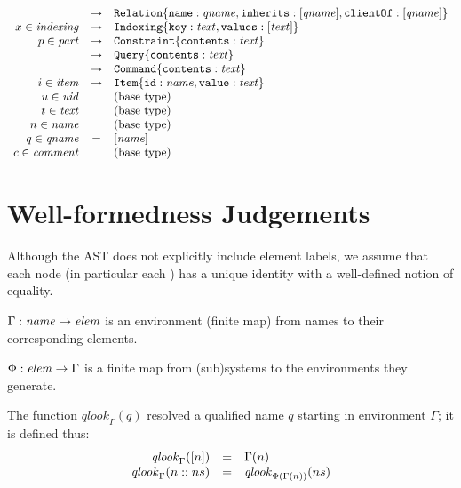 \documentclass{article}
\begin{document}
\[\begin{array}{rcll}
                  & \rightarrow & \texttt{Relation}\{\texttt{name}:\mathit{qname},\texttt{inherits}:[{\mathit{qname}}],
                                                  \texttt{clientOf}:[{\mathit{qname}}]\} \\
  x \in \mathit{indexing} & \rightarrow & \texttt{Indexing}\{\texttt{key}:\mathit{text},\texttt{values}:[{\mathit{text}}]\} \\
  p \in \mathit{part} & \rightarrow & \texttt{Constraint}\{\texttt{contents}:\mathit{text} \} \\
  & \rightarrow & \texttt{Query}\{\texttt{contents}:\mathit{text}\} \\
                  & \rightarrow & \texttt{Command}\{\texttt{contents}:\mathit{text}\} \\
  i \in \mathit{item} & \rightarrow & \texttt{Item}\{\texttt{id}:\mathit{name},\texttt{value}:\mathit{text} \} \\
  u \in \mathit{uid} & & \text{(base type)} \\
  t \in \mathit{text}& & \text{(base type)} \\
  n \in \mathit{name}& & \text{(base type)} \\
  q \in \mathit{qname}& = & [{\mathit{name}}] \\
  c \in \mathit{comment}&  & \text{(base type)} \\
\end{array}
\]
  
\vfill\eject

\section{Well-formedness Judgements}

\newcommand{\senv}{\Phi}
\newcommand{\env}{\Gamma}
\newcommand{\qlookup}[2]{\mathit{qlook}_{#1}({#2})}
\newcommand{\qnames}[1]{\mathit{qnames}({#1})}
\newcommand{\nocycles}[1]{\mathit{nocycles}({#1})}

Although the AST does not explicitly include element labels, we assume that each node (in particular each ) 
has a unique identity with a well-defined notion of equality.

$\env : \nt{name} \rightarrow \nt{elem}$ is an environment (finite map) from names
to their corresponding elements.

$\senv : \nt{elem} \rightarrow \env$ is a finite map from (sub)systems
to the environments they generate. 

The function $\qlookup{\env}{q}$ resolved a qualified name $q$ starting in environment $\env$; it is defined thus:
\[
\begin{array}{rcl}
\qlookup{\env}{\singlelist{n}} &= &\env(n) \\
\qlookup{\env}{\conslist{n}{ns}} & =& \qlookup{\senv(\env(n))}{ns}
\end{array}
\]
\end{document}
